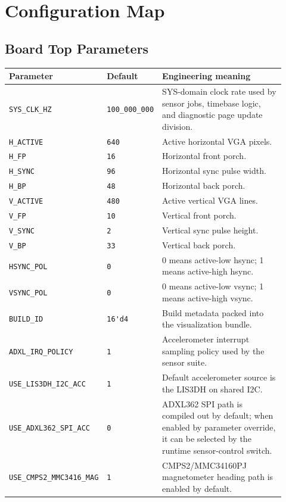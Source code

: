 \documentclass{article}
\newcommand{\sig}[1]{\begingroup\nolinkurl{#1}\endgroup}
\newcommand{\param}[1]{\begingroup\nolinkurl{#1}\endgroup}
\begin{document}
\section{Configuration Map}

\subsection{Board Top Parameters}

\begin{longtable}{p{0.27\linewidth} p{0.15\linewidth} p{0.50\linewidth}}
\toprule
\textbf{Parameter} & \textbf{Default} & \textbf{Engineering meaning} \\
\midrule
\endhead
\param{SYS_CLK_HZ} & \sig{100_000_000} &
SYS-domain clock rate used by sensor jobs, timebase logic, and diagnostic page
update division. \\
\param{H_ACTIVE} & \sig{640} &
Active horizontal VGA pixels. \\
\param{H_FP} & \sig{16} &
Horizontal front porch. \\
\param{H_SYNC} & \sig{96} &
Horizontal sync pulse width. \\
\param{H_BP} & \sig{48} &
Horizontal back porch. \\
\param{V_ACTIVE} & \sig{480} &
Active vertical VGA lines. \\
\param{V_FP} & \sig{10} &
Vertical front porch. \\
\param{V_SYNC} & \sig{2} &
Vertical sync pulse height. \\
\param{V_BP} & \sig{33} &
Vertical back porch. \\
\param{HSYNC_POL} & \sig{0} &
0 means active-low hsync; 1 means active-high hsync. \\
\param{VSYNC_POL} & \sig{0} &
0 means active-low vsync; 1 means active-high vsync. \\
\param{BUILD_ID} & \sig{16'd4} &
Build metadata packed into the visualization bundle. \\
\param{ADXL_IRQ_POLICY} & \sig{1} &
Accelerometer interrupt sampling policy used by the sensor suite. \\
\param{USE_LIS3DH_I2C_ACC} & \sig{1} &
Default accelerometer source is the LIS3DH on shared I2C. \\
\param{USE_ADXL362_SPI_ACC} & \sig{0} &
ADXL362 SPI path is compiled out by default; when enabled by parameter
override, it can be selected by the runtime sensor-control switch. \\
\param{USE_CMPS2_MMC3416_MAG} & \sig{1} &
CMPS2/MMC34160PJ magnetometer heading path is enabled by default. \\

\end{longtable}
\end{document}

